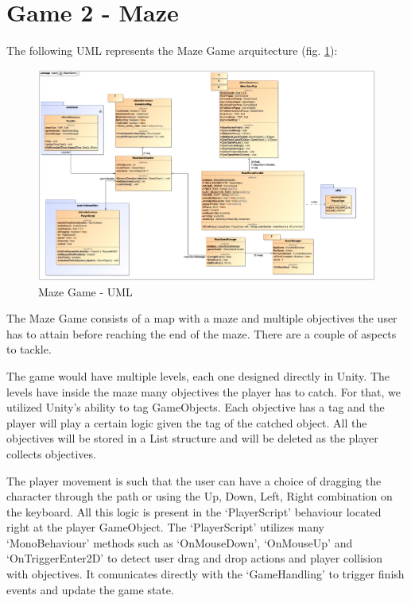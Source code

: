 \newpage
\section{Game 2 - Maze}

The following UML represents the Maze Game arquitecture (fig. \ref*{fig:mazeGameArq}):

\begin{figure}[!h]
    \centering
    \includegraphics[scale=0.30]{Chapters/arq/MazeGame.jpg}
    \caption{Maze Game - UML}
    \label{fig:mazeGameArq}
\end{figure}

The Maze Game consists of a map with a maze and multiple objectives the user has to attain before reaching the end of the maze. There are a couple of aspects to tackle.

The game would have multiple levels, each one designed directly in Unity. The levels have inside the maze many objectives the player has to catch. For that, we utilized Unity's ability to tag GameObjects. Each objective has a tag and the player will play a certain logic given the tag of the catched object. All the objectives will be stored in a List structure and will be deleted as the player collects objectives.

The player movement is such that the user can have a choice of dragging the character through the path or using the Up, Down, Left, Right combination on the keyboard. All this logic is present in the `PlayerScript' behaviour located right at the player GameObject. The `PlayerScript' utilizes many `MonoBehaviour' methods such as `OnMouseDown', `OnMouseUp' and `OnTriggerEnter2D' to detect user drag and drop actions and player collision with objectives. It comunicates directly with the `GameHandling' to trigger finish events and update the game state.

